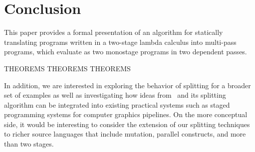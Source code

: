 \section{Conclusion}

This paper provides a formal presentation of an algorithm for
statically translating programs written in a two-stage lambda calculus
into multi-pass programs, which evaluate as two monostage programs in
two dependent passes.  

\TODO THEOREMS THEOREMS THEOREMS

In addition, we are interested in exploring the behavior of splitting
for a broader set of examples as well as investigating how ideas from
\lang\ and its splitting algorithm can be integrated into existing
practical systems such as staged programming systems for computer
graphics pipelines.  On the more conceptual side, it would be
interesting to consider the extension of our splitting techniques to
richer source languages that include mutation, parallel constructs,
and more than two stages.

